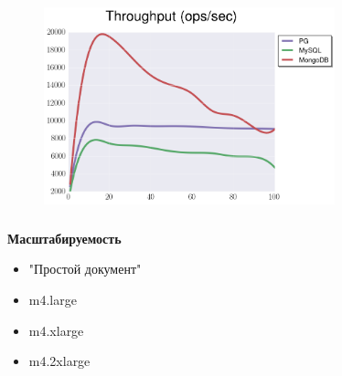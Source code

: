 \documentclass[usenames,dvipsnames, 18pt, compress, aspectratio=169]{beamer}
\begin{document}
\begin{frame}
    \frametitle{}
    \begin{center}
    \begin{figure}
        \includegraphics[width=0.75\textwidth,center]{benchmarks/select_slice_10_btree_throughput.png}
    \end{figure}
    \end{center}
\end{frame}

%
\begin{frame}
    \frametitle{}
\end{frame}


\begin{frame}
    \frametitle{}
    \begin{center}
        \textbf{Масштабируемость}
        \begin{itemize}[label={}]
            \item "Простой документ"
            \item m4.large
            \item m4.xlarge
            \item m4.2xlarge
        \end{itemize}
    \end{center}
\end{frame}
\end{document}
